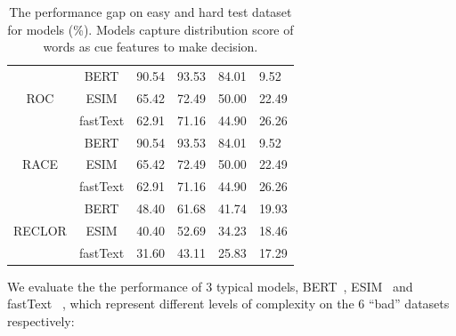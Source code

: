 \begin{table}[th]
\begin{tabular}{ccllll}
\multicolumn{1}{c}{\multirow{3}{*}{ROC}}    & BERT                       & \multicolumn{1}{l}{90.54}    & 93.53                         & 84.01                         & 9.52             \\
\multicolumn{1}{c}{}                        & ESIM                       & \multicolumn{1}{l}{65.42}    & 72.49                         & 50.00                         & 22.49                  \\
\multicolumn{1}{c}{}                        & fastText                   & \multicolumn{1}{l}{62.91}    & 71.16                         & 44.90                         & 26.26                 \\ \hline
\multicolumn{1}{c}{\multirow{3}{*}{RACE}}   & BERT                       & \multicolumn{1}{l}{90.54}    & 93.53                         & 84.01                         & 9.52                           \\
\multicolumn{1}{c}{}                        & ESIM                       & \multicolumn{1}{l}{65.42}    & 72.49                         & 50.00                         & 22.49                       \\
\multicolumn{1}{c}{}                        & fastText                   & \multicolumn{1}{l}{62.91}    & 71.16                         & 44.90                         & 26.26                        \\ \hline
\multicolumn{1}{c}{\multirow{3}{*}{RECLOR}} & BERT                       & \multicolumn{1}{l}{48.40}    & 61.68                         & 41.74          & 19.93         \\
\multicolumn{1}{c}{}                        & ESIM                       & \multicolumn{1}{l}{40.40}    & 52.69                         & 34.23                         & 18.46                 \\
\multicolumn{1}{c}{}                        & fastText                   & \multicolumn{1}{l}{31.60}    & 43.11                         & 25.83                         & 17.29                          \\ \hline
\end{tabular}
\caption{\label{gap_acc} The performance gap on easy and hard test dataset for models (\%). 
Models capture distribution score of words as cue features to make decision.}
\end{table}


We evaluate the the performance of 3 typical models, 
BERT~\cite{devlin2018bert}, ESIM~\cite{peters2018deep} and fastText~\cite{joulin2017bag} , 
which represent different levels of complexity on the 6 ``bad'' datasets respectively:


